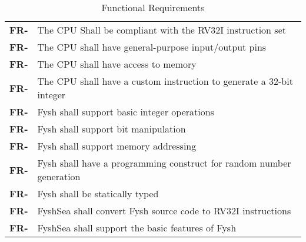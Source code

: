 \resetfyshcounter
\newcommand{\fr}[1]{%
	\textbf{FR-\rc} & #1 \\%
	\hline%
}
\begin{table}[H]
	\begin{tabularx}{\textwidth}{| a | x |}
		\hline
		 &  \\
		\hline
		\fr{The CPU Shall be compliant with the RV32I instruction set}
		\fr{The CPU shall have general-purpose input/output pins}
		\fr{The CPU shall have access to memory}
		\fr{The CPU shall have a custom instruction to generate a 32-bit integer}
		\fr{Fysh shall support basic integer operations}
		\fr{Fysh shall support bit manipulation}
		\fr{Fysh shall support memory addressing}
		\fr{Fysh shall have a programming construct for random number generation}
		\fr{Fysh shall be statically typed}
		\fr{FyshSea shall convert Fysh source code to RV32I instructions}
		\fr{FyshSea shall support the basic features of Fysh}
	\end{tabularx}
	\caption{Functional Requirements}
\end{table}

